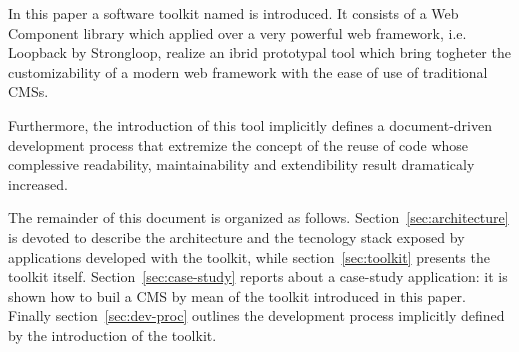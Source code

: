 In this paper a software toolkit named  is introduced. It consists of a Web Component library which applied over a very powerful web framework, i.e. Loopback by Strongloop, realize an ibrid prototypal tool which bring togheter the customizability of a modern web framework with the ease of use of traditional CMSs.

Furthermore, the introduction of this tool implicitly defines a document-driven development process that extremize the concept of the reuse of code whose complessive readability, maintainability and extendibility result dramaticaly increased.


The remainder of this document is organized as follows. Section~\ref{sec:architecture} is devoted to describe the architecture and the tecnology stack exposed by applications developed with the toolkit, while section~\ref{sec:toolkit} presents the toolkit itself. Section~\ref{sec:case-study} reports about a case-study application: it is shown how to buil a CMS by mean of the toolkit introduced in this paper. Finally section~\ref{sec:dev-proc} outlines the development process implicitly defined by the introduction of the  toolkit.

